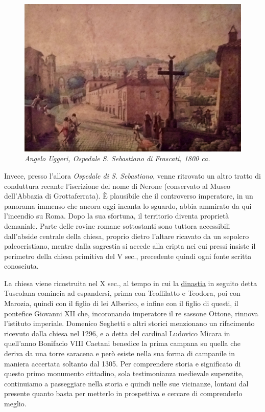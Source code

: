 \documentclass[
  letterpaper,
  DIV=11,
  numbers=noendperiod]{scrartcl}
\begin{document}
\begin{figure}[H]

{\centering \includegraphics{../../images/2024/san_rocco/8largo-pentini.jpg}

}

\caption{\emph{Angelo Uggeri, Ospedale S. Sebastiano di Frascati, 1800
ca.}}

\end{figure}%

Invece, presso l'allora \emph{Ospedale di S. Sebastiano}, venne
ritrovato un altro tratto di conduttura recante l'iscrizione del nome di
Nerone (conservato al Museo dell'Abbazia di Grottaferrata). È plausibile
che il controverso imperatore, in un panorama immenso che ancora oggi
incanta lo sguardo, abbia ammirato da qui l'incendio su Roma. Dopo la
sua sfortuna, il territorio diventa proprietà demaniale. Parte delle
rovine romane sottostanti sono tuttora accessibili dall'abside centrale
della chiesa, proprio dietro l'altare ricavato da un sepolcro
paleocristiano, mentre dalla sagrestia si accede alla cripta nei cui
pressi insiste il perimetro della chiesa primitiva del V sec.,
precedente quindi ogni fonte scritta conosciuta.

La chiesa viene ricostruita nel X sec., al tempo in cui la
\href{2012-05-10-possedimenti-memorie-tuscolo-comandini.html}{dinastia}
in seguito detta Tuscolana comincia ad espandersi, prima con Teoflilatto
e Teodora, poi con Marozia, quindi con il figlio di lei Alberico, e
infine con il figlio di questi, il pontefice Giovanni XII che,
incoronando imperatore il re sassone Ottone, rinnova l'istituto
imperiale. Domenico Seghetti e altri storici menzionano un rifacimento
ricevuto dalla chiesa nel 1296, e a detta del cardinal Ludovico Micara
in quell'anno Bonifacio VIII Caetani benedice la prima campana su quella
che deriva da una torre saracena e però esiste nella sua forma di
campanile in maniera accertata soltanto dal 1305. Per comprendere storia
e significato di questo primo monumento cittadino, sola testimonianza
medievale superstite, continuiamo a passeggiare nella storia e quindi
nelle sue vicinanze, lontani dal presente quanto basta per metterlo in
prospettiva e cercare di comprenderlo meglio.
\end{document}
